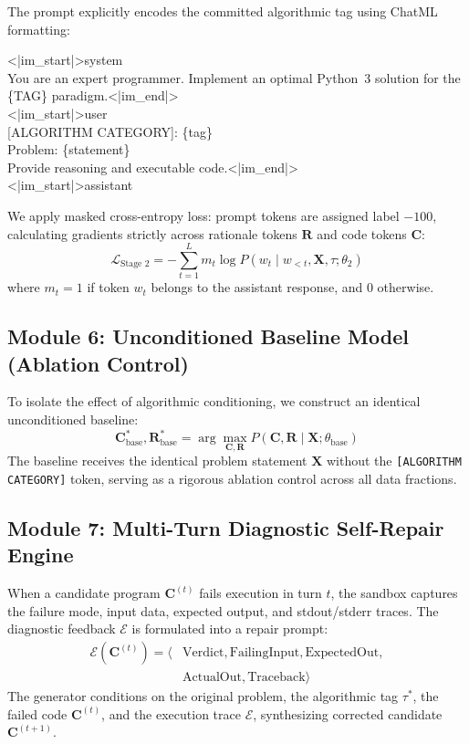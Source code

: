 \documentclass{ieeeaccess}
\begin{document}
The prompt explicitly encodes the committed algorithmic tag using ChatML formatting:
\begin{center}
\begin{minipage}{0.98\columnwidth}
\footnotesize\ttfamily
<|im\_start|>system\\
You are an expert programmer. Implement an optimal Python~3 solution for the \{TAG\} paradigm.<|im\_end|>\\
<|im\_start|>user\\
{[ALGORITHM CATEGORY]}: \{tag\}\\
Problem: \{statement\}\\
Provide reasoning and executable code.<|im\_end|>\\
<|im\_start|>assistant
\end{minipage}
\end{center}

We apply masked cross-entropy loss: prompt tokens are assigned label $-100$, calculating gradients strictly across rationale tokens $\mathbf{R}$ and code tokens $\mathbf{C}$:
\begin{equation}
\mathcal{L}_{\text{Stage 2}} = -\sum_{t=1}^L m_t \log P(w_t \mid w_{<t}, \mathbf{X}, \tau; \theta_2)
\end{equation}
where $m_t = 1$ if token $w_t$ belongs to the assistant response, and $0$ otherwise.

\subsection{Module 6: Unconditioned Baseline Model (Ablation Control)}
To isolate the effect of algorithmic conditioning, we construct an identical unconditioned baseline:
\begin{equation}
\mathbf{C}_{\text{base}}^*, \mathbf{R}_{\text{base}}^* = \arg\max_{\mathbf{C}, \mathbf{R}} P(\mathbf{C}, \mathbf{R} \mid \mathbf{X}; \theta_{\text{base}})
\end{equation}
The baseline receives the identical problem statement $\mathbf{X}$ without the \texttt{[ALGORITHM CATEGORY]} token, serving as a rigorous ablation control across all data fractions.

\subsection{Module 7: Multi-Turn Diagnostic Self-Repair Engine}
When a candidate program $\mathbf{C}^{(t)}$ fails execution in turn $t$, the sandbox captures the failure mode, input data, expected output, and stdout/stderr traces. The diagnostic feedback $\mathcal{E}$ is formulated into a repair prompt:
\begin{equation}
\label{eq:repair_prompt}
\begin{aligned}
\mathcal{E}(\mathbf{C}^{(t)}) = \langle &\text{Verdict}, \text{FailingInput}, \text{ExpectedOut}, \\
&\text{ActualOut}, \text{Traceback} \rangle
\end{aligned}
\end{equation}
The generator conditions on the original problem, the algorithmic tag $\tau^*$, the failed code $\mathbf{C}^{(t)}$, and the execution trace $\mathcal{E}$, synthesizing corrected candidate $\mathbf{C}^{(t+1)}$.
\end{document}

